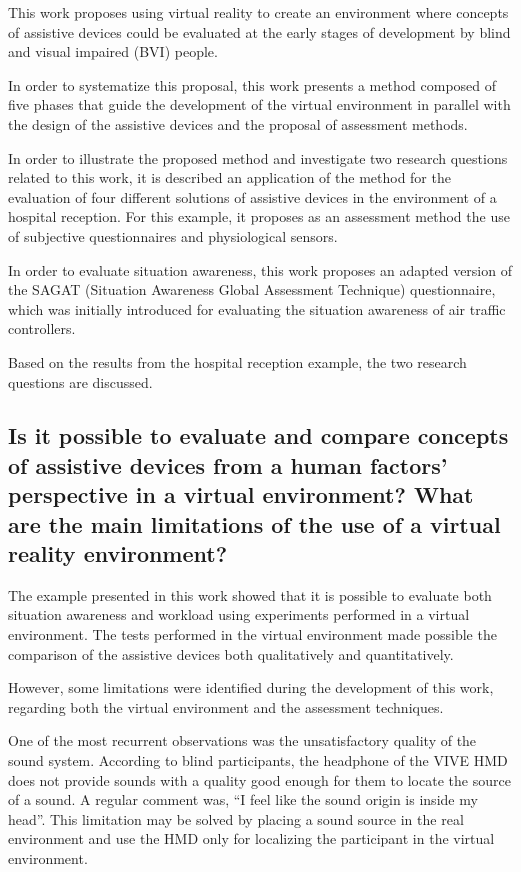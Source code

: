 This work proposes using virtual reality to create an environment where concepts of assistive devices could be evaluated at the early stages of development by blind and visual impaired (BVI) people.

In order to systematize this proposal, this work presents a method composed of five phases that guide the development of the virtual environment in parallel with the design of the assistive devices and the proposal of assessment methods.

In order to illustrate the proposed method and investigate two research questions related to this work, it is described an application of the method for the evaluation of four different solutions of assistive devices in the environment of a hospital reception. For this example, it proposes as an assessment method the use of subjective questionnaires and physiological sensors. 

In order to evaluate situation awareness, this work proposes an adapted version of the SAGAT (Situation Awareness Global Assessment Technique) questionnaire, which was initially introduced for evaluating the situation awareness of air traffic controllers. 

Based on the results from the hospital reception example, the two research questions are discussed.


\subsection*{Is it possible to evaluate and compare concepts of assistive devices from a human factors’ perspective in a virtual environment? What are the main limitations of the use of a virtual reality environment?
}

The example presented in this work showed that it is possible to evaluate both situation awareness and workload using experiments performed in a virtual environment. The tests performed in the virtual environment made possible the comparison of the assistive devices both qualitatively and quantitatively.

However, some limitations were identified during the development of this work, regarding both the virtual environment and the assessment techniques.

One of the most recurrent observations was the unsatisfactory quality of the sound system. According to blind participants, the headphone of the VIVE HMD does not provide sounds with a quality good enough for them to locate the source of a sound. A regular comment was, “I feel like the sound origin is inside my head”. This limitation may be solved by placing a sound source in the real environment and use the HMD only for localizing the participant in the virtual environment.

